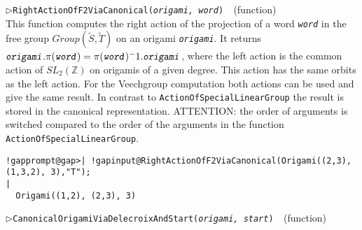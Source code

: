 \documentclass[a4paper,11pt]{report}
\begin{document}
{{{\begin{Verbatim}[commandchars=!@|,fontsize=\small,frame=single,label=Example]
\end{Verbatim}
 \noindent\textcolor{FuncColor}{$\triangleright$\enspace\texttt{RightActionOfF2ViaCanonical({\mdseries\slshape origami, word})
\label{RightActionOfF2ViaCanonical}
}\hfill{\scriptsize (function)}}\\


 This function computes the right action of the projection of a word \mbox{\texttt{\mdseries\slshape word}} in the free group $Group(\tilde{S}, \tilde{T})$ on an origami \mbox{\texttt{\mdseries\slshape origami}}. It returns $\mbox{\texttt{\mdseries\slshape origami}}.\pi(\mbox{\texttt{\mdseries\slshape word}}) = \pi(\mbox{\texttt{\mdseries\slshape word}})^-1.\mbox{\texttt{\mdseries\slshape origami}}$, where the left action is the common action of $SL_2(\mathbb{Z})$ on origamis of a given degree. This action has the same orbits as the left
action. For the Veechgroup computation both actions can be used and give the
same result. In contrast to \texttt{ActionOfSpecialLinearGroup} the result is stored in the canonical representation. ATTENTION: the order of
arguments is switched compared to the order of the arguments in the function \texttt{ActionOfSpecialLinearGroup}. 
\begin{Verbatim}[commandchars=!@|,fontsize=\small,frame=single,label=Example]
  !gapprompt@gap>| !gapinput@RightActionOfF2ViaCanonical(Origami((2,3), (1,3,2), 3),"T");
|
  Origami((1,2), (2,3), 3)
\end{Verbatim}
 \noindent\textcolor{FuncColor}{$\triangleright$\enspace\texttt{CanonicalOrigamiViaDelecroixAndStart({\mdseries\slshape origami, start})
\label{CanonicalOrigamiViaDelecroixAndStart}
}\hfill{\scriptsize (function)}}\\


}}}
\end{document}
